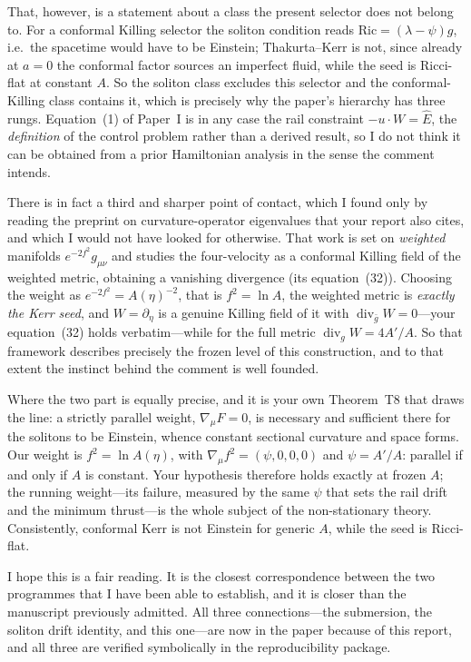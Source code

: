 \documentclass[11pt]{article}
\begin{document}
That, however, is a statement about a class the present selector does not belong
to. For a conformal Killing selector the soliton condition reads
$\mathrm{Ric}=(\lambda-\psi)g$, i.e.\ the spacetime would have to be Einstein;
Thakurta--Kerr is not, since already at $a=0$ the conformal factor sources an
imperfect fluid, while the seed is Ricci-flat at constant $A$. So the soliton
class excludes this selector and the conformal-Killing class contains it, which
is precisely why the paper's hierarchy has three rungs. Equation~(1) of Paper~I
is in any case the rail constraint $-u\cdot W=\hat E$, the \emph{definition} of
the control problem rather than a derived result, so I do not think it can be
obtained from a prior Hamiltonian analysis in the sense the comment intends.

There is in fact a third and sharper point of contact, which I found only by
reading the preprint on curvature-operator eigenvalues that your report also
cites, and which I would not have looked for otherwise. That work is set on
\emph{weighted} manifolds $e^{-2f^2}g_{\mu\nu}$ and studies the four-velocity as a
conformal Killing field of the weighted metric, obtaining a vanishing divergence
(its equation~(32)). Choosing the weight as $e^{-2f^2}=A(\eta)^{-2}$, that is
$f^2=\ln A$, the weighted metric is \emph{exactly the Kerr seed}, and
$W=\partial_\eta$ is a genuine Killing field of it with
$\operatorname{div}_{\bar g}W=0$---your equation~(32) holds verbatim---while for
the full metric $\operatorname{div}_gW=4A'/A$. So that framework describes
precisely the frozen level of this construction, and to that extent the instinct
behind the comment is well founded.

Where the two part is equally precise, and it is your own Theorem~T8 that draws
the line: a strictly parallel weight, $\nabla_\mu F=0$, is necessary and
sufficient there for the solitons to be Einstein, whence constant sectional
curvature and space forms. Our weight is $f^2=\ln A(\eta)$, with
$\nabla_\mu f^2=(\psi,0,0,0)$ and $\psi=A'/A$: parallel if and only if $A$ is
constant. Your hypothesis therefore holds exactly at frozen $A$; the running
weight---its failure, measured by the same $\psi$ that sets the rail drift and
the minimum thrust---is the whole subject of the non-stationary theory.
Consistently, conformal Kerr is not Einstein for generic $A$, while the seed is
Ricci-flat.

I hope this is a fair reading. It is the closest correspondence between the two
programmes that I have been able to establish, and it is closer than the
manuscript previously admitted. All three connections---the submersion, the
soliton drift identity, and this one---are now in the paper because of this
report, and all three are verified symbolically in the reproducibility package.
\end{document}
